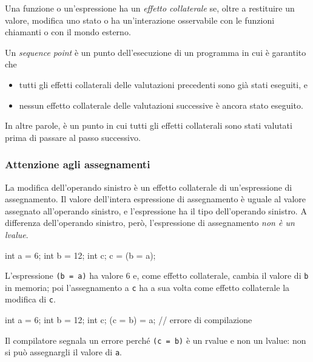 \documentclass[11pt,a4paper]{article}
\begin{document}
Una funzione o un'espressione ha un \emph{effetto collaterale} se, oltre a restituire un valore, modifica uno stato o ha un'interazione osservabile con le funzioni chiamanti o con il mondo esterno.

\begin{definizione}
Un \emph{sequence point} è un punto dell'esecuzione di un programma in cui è garantito che
\begin{itemize}
    \item tutti gli effetti collaterali delle valutazioni precedenti sono già stati eseguiti, e
    \item nessun effetto collaterale delle valutazioni successive è ancora stato eseguito.
\end{itemize}
In altre parole, è un punto in cui tutti gli effetti collaterali sono stati valutati prima di passare al passo successivo.
\end{definizione}

\subsubsection{Attenzione agli assegnamenti}

La modifica dell'operando sinistro è un effetto collaterale di un'espressione di assegnamento. Il valore dell'intera espressione di assegnamento è uguale al valore assegnato all'operando sinistro, e l'espressione ha il tipo dell'operando sinistro. A differenza dell'operando sinistro, però, l'espressione di assegnamento \emph{non è un lvalue}.

\begin{esempio}
\begin{codice}
int a = 6;
int b = 12;
int c;
c = (b = a);
\end{codice}
L'espressione \lstinline|(b = a)| ha valore $6$ e, come effetto collaterale, cambia il valore di \lstinline|b| in memoria; poi l'assegnamento a \lstinline|c| ha a sua volta come effetto collaterale la modifica di \lstinline|c|.
\end{esempio}

\begin{esempio}
\begin{codice}
int a = 6;
int b = 12;
int c;
(c = b) = a;     // errore di compilazione
\end{codice}
Il compilatore segnala un errore perché \lstinline|(c = b)| è un rvalue e non un lvalue: non si può assegnargli il valore di \lstinline|a|.
\end{esempio}
\end{document}

